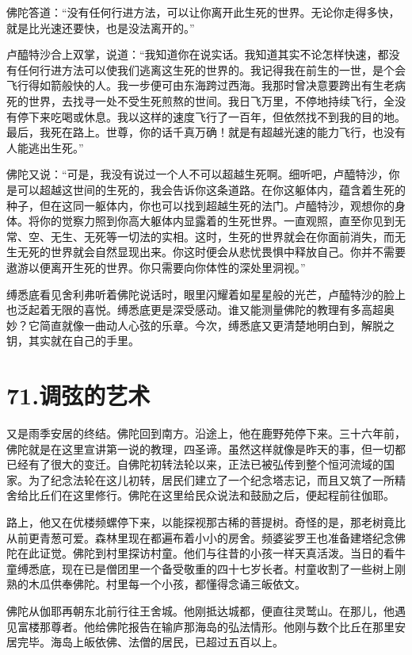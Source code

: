 \documentclass[12pt,twoside,openany]{book}
\begin{document}
佛陀答道：“没有任何行进方法，可以让你离开此生死的世界。无论你走得多快，就是比光速还要快，也是没法离开的。”

卢醯特沙合上双掌，说道：“我知道你在说实话。我知道其实不论怎样快速，都没有任何行进方法可以使我们逃离这生死的世界的。我记得我在前生的一世，是个会飞行得如箭般快的人。我一步便可由东海跨过西海。我那时曾决意要跨出有生老病死的世界，去找寻一处不受生死煎熬的世间。我日飞万里，不停地持续飞行，全没有停下来吃喝或休息。我以这样的速度飞行了一百年，但依然找不到我的目的地。最后，我死在路上。世尊，你的话千真万确！就是有超越光速的能力飞行，也没有人能逃出生死。”

佛陀又说：“可是，我没有说过一个人不可以超越生死啊。细听吧，卢醯特沙，你是可以超越这世间的生死的，我会告诉你这条道路。在你这躯体内，蕴含着生死的种子，但在这同一躯体内，你也可以找到超越生死的法门。卢醯特沙，观想你的身体。将你的觉察力照到你高大躯体内显露着的生死世界。一直观照，直至你见到无常、空、无生、无死等一切法的实相。这时，生死的世界就会在你面前消失，而无生无死的世界就会自然显现出来。你这时便会从悲忧畏惧中释放自己。你并不需要遨游以便离开生死的世界。你只需要向你体性的深处里洞视。”

缚悉底看见舍利弗听着佛陀说话时，眼里闪耀着如星星般的光芒，卢醯特沙的脸上也泛起着无限的喜悦。缚悉底更是深受感动。谁又能测量佛陀的教理有多高超奥妙？它简直就像一曲动人心弦的乐章。今次，缚悉底又更清楚地明白到，解脱之钥，其实就在自己的手里。


\chapter{71.调弦的艺术}\label{ch71}

又是雨季安居的终结。佛陀回到南方。沿途上，他在鹿野苑停下来。三十六年前，佛陀就是在这里宣讲第一说的教理，四圣谛。虽然这样就像是昨天的事，但一切都已经有了很大的变迁。自佛陀初转法轮以来，正法已被弘传到整个恒河流域的国家。为了纪念法轮在这儿初转，居民们建立了一个纪念塔志记，而且又筑了一所精舍给比丘们在这里修行。佛陀在这里给民众说法和鼓励之后，便起程前往伽耶。

路上，他又在优楼频螺停下来，以能探视那古稀的菩提树。奇怪的是，那老树竟比从前更青葱可爱。森林里现在都遍布着小小的房舍。频婆娑罗王也准备建塔纪念佛陀在此证觉。佛陀到村里探访村童。他们与往昔的小孩一样天真活泼。当日的看牛童缚悉底，现在已是僧团里一个备受敬重的四十七岁长者。村童收割了一些树上刚熟的木瓜供奉佛陀。村里每一个小孩，都懂得念诵三皈依文。

佛陀从伽耶再朝东北前行往王舍城。他刚抵达城都，便直往灵鹫山。在那儿，他遇见富楼那尊者。他给佛陀报告在输庐那海岛的弘法情形。他刚与数个比丘在那里安居完毕。海岛上皈依佛、法僧的居民，已超过五百以上。
\end{document}
